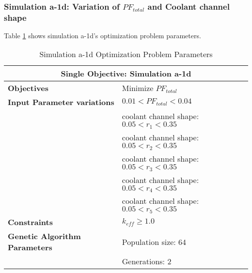 \subsubsection{Simulation a-1d: Variation of $PF_{total}$ and Coolant channel shape}
Table \ref{tab:simulationa1d} shows simulation a-1d's optimization problem parameters. 
\begin{table}[htbp!]
    \centering
    \onehalfspacing
    \caption{Simulation a-1d Optimization Problem Parameters}
	\label{tab:simulationa1d}
    \footnotesize
    \begin{tabular}{l|p{6cm}}
    \hline 
    \multicolumn{2}{c}{\textbf{Single Objective: Simulation a-1d}} \\
    \hline 
    \textbf{Objectives} & Minimize $PF_{total}$ \\
    \hline 
    \textbf{Input Parameter variations} & $0.01<PF_{total}<0.04$ \\
    & coolant channel shape: $0.05<r_{1}<0.35$ \\
    & coolant channel shape: $0.05<r_{2}<0.35$ \\
    & coolant channel shape: $0.05<r_{3}<0.35$ \\
    & coolant channel shape: $0.05<r_{4}<0.35$ \\
    & coolant channel shape: $0.05<r_{5}<0.35$ \\
    \hline
    \textbf{Constraints} & $k_{eff} \geq 1.0$\\ 
    \hline 
    \textbf{Genetic Algorithm Parameters} & Population size: 64 \\
    & Generations: 2 \\
    \hline
    \end{tabular}
\end{table}

